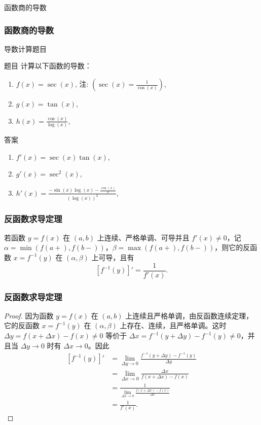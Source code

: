 \documentclass[
10pt,
aspectratio=43,
]{beamer}
\begin{document}
\begin{frame}{函数商的导数}
	\frametitle{函数商的导数}{导数计算题目}
		
	\begin{exampleblock}{题目}
		计算以下函数的导数：
		\begin{enumerate}
			\item $f(x) = \sec(x)$, 注: $\left(\sec(x)=\displaystyle\frac{1}{\cos(x)}\right),$
			\item $g(x) = \tan(x)$,
			\item $h(x) = \displaystyle\frac{\cos(x)}{\log(x)}$,
		\end{enumerate}
	\end{exampleblock}
		
	\pause
		
	\begin{exampleblock}{答案}
		\begin{enumerate}
			\item $f'(x) = \sec(x) \tan(x)$,
			\item $g'(x) = \sec^2(x)$,
			\item $h'(x) = \displaystyle\frac{-\sin(x)\log(x)-\displaystyle\frac{\cos(x)}{x}}{(\log(x))^2}$,
		\end{enumerate}
	\end{exampleblock}
		
\end{frame}

\begin{frame}
	\frametitle{反函数求导定理}
		
	\begin{theorem}[定理 4.3.4]
		若函数 $y=f(x)$ 在 $(a, b)$ 上连续、严格单调、可导并且 $f'(x) \neq 0$，记 $\alpha=\min(f(a+), f(b-))$，$\beta=\max(f(a+), f(b-))$，则它的反函数 $x=f^{-1}(y)$ 在 $(\alpha, \beta)$ 上可导，且有
		\[
			\left[f^{-1}(y)\right]' = \frac{1}{f'(x)}.
		\]
	\end{theorem}
	
\end{frame}
\begin{frame}
	\frametitle{反函数求导定理}
	\begin{proof}
		因为函数 $y=f(x)$ 在 $(a, b)$ 上连续且严格单调，由反函数连续定理，它的反函数 $x=f^{-1}(y)$ 在 $(\alpha, \beta)$ 上存在、连续，且严格单调。这时 $\Delta y=f(x+\Delta x)-f(x) \neq 0$ 等价于 $\Delta x=f^{-1}(y+\Delta y)-f^{-1}(y) \neq 0$，并且当 $\Delta y \rightarrow 0$ 时有 $\Delta x \rightarrow 0$。因此
		\[
			\begin{aligned}
				\left[f^{-1}(y)\right]' & = \lim_{\Delta y \rightarrow 0} \frac{f^{-1}(y+\Delta y)-f^{-1}(y)}{\Delta y} \\
				                        & = \lim_{\Delta x \rightarrow 0} \frac{\Delta x}{f(x+\Delta x)-f(x)}           \\
				                        & = \frac{1}{\lim_{\Delta x \rightarrow 0} \frac{f(x+\Delta x)-f(x)}{\Delta x}} \\
				                        & = \frac{1}{f'(x)}.                                                            
			\end{aligned}
		\]
	\end{proof}
\end{frame}
\end{document}
